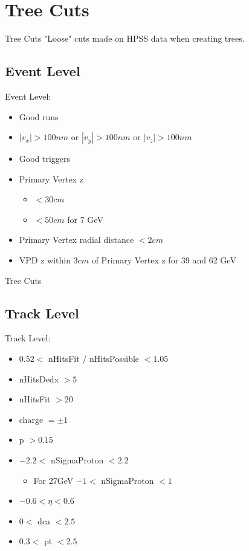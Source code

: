 \documentclass{beamer}
\begin{document}
\section{Tree Cuts}

\begin{frame}{Tree Cuts}
"Loose" cuts made on HPSS data when creating trees. \newline \newline \newline
\subsection{Event Level}
Event Level:
	\begin{itemize}
		\item Good runs
		\item $|v_{x}| > 100nm$ or $|v_{y}| > 100nm$ or $|v_{z}| > 100nm$
		\item Good triggers
		\item Primary Vertex z
		\begin{itemize}
		    \item $ < 30cm$
		    \item $ < 50cm$ for 7 GeV
		\end{itemize}
		\item Primary Vertex radial distance $< 2cm$
		\item VPD z within $3cm$ of Primary Vertex z for 39 and 62 GeV
	\end{itemize}
\end{frame}

\begin{frame}{Tree Cuts}
\subsection{Track Level}
Track Level:
    \begin{itemize}
        \item $0.52 <$ nHitsFit / nHitsPossible $< 1.05$ 
        \item nHitsDedx $> 5$
        \item nHitsFit $> 20$
        \item charge $= \pm 1$
        \item p $>0.15$
        \item $-2.2 <$ nSigmaProton $< 2.2$
            \begin{itemize}
                \item For 27GeV $-1 <$ nSigmaProton $< 1$
            \end{itemize}
        \item $-0.6 < \eta < 0.6$
        \item $0 < $ dca $<2.5$
        \item $0.3 <$ pt $< 2.5$
    \end{itemize}

\end{frame}
\end{document}
